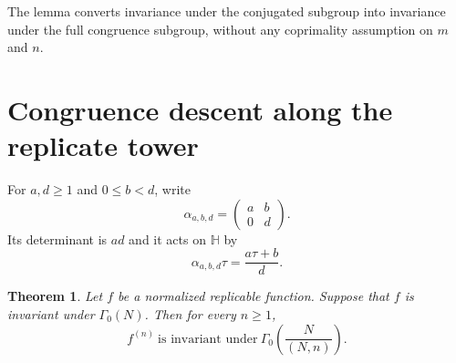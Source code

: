 \documentclass[12pt]{amsart}
\newtheorem{thm}{Theorem}[section]
\theoremstyle{definition}
\theoremstyle{remark}
\numberwithin{equation}{section}
\newcommand{\Hh}{\mathbb H}
\begin{document}
The lemma converts invariance under the conjugated subgroup into invariance under the full congruence subgroup, without any coprimality assumption on $m$ and $n$.

\section{Congruence descent along the replicate tower}

For $a,d\geq1$ and $0\leq b<d$, write
\[
\alpha_{a,b,d}=\begin{pmatrix}a&b\\0&d\end{pmatrix}.
\]
Its determinant is $ad$ and it acts on $\Hh$ by
\[
\alpha_{a,b,d}\tau=\frac{a\tau+b}{d}.
\]

\begin{thm}\label{thm:congruence-descent}
Let $f$ be a normalized replicable function. Suppose that $f$ is invariant under $\Gamma_0(N)$. Then for every $n\geq1$,
\begin{equation}\label{eq:descent-level}
f^{(n)}\ \text{is invariant under}\ 
\Gamma_0\!\left(\frac{N}{(N,n)}\right).
\end{equation}
\end{thm}
\end{document}
